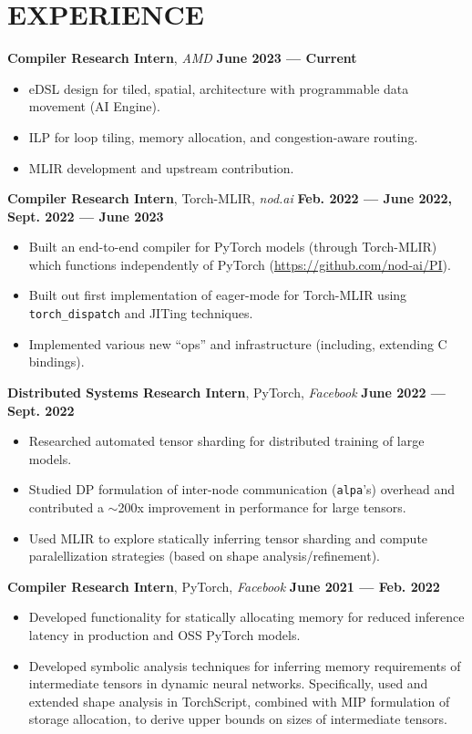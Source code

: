 \documentclass[11pt,letterpaper,roman,colorlinks,linkcolor=blue]{moderncv}
\newcommand*{\modern}{\fontfamily{qhv}\selectfont}
\newcommand{\mystyle}[1]{\textcolor{mygrey}{\modern #1}}
\newcommand{\mysectionstyle}[1]{\large\mystyle{#1}}
\begin{document}
\section{\mysectionstyle{EXPERIENCE}}

\textbf{Compiler Research Intern}, \emph{AMD}
\hfill \textbf{June 2023 --- Current}
\begin{itemize}
\item eDSL design for tiled, spatial, architecture with programmable data movement (AI Engine).
\item ILP for loop tiling, memory allocation, and congestion-aware routing.
\item MLIR development and upstream contribution.
\end{itemize}

\textbf{Compiler Research Intern}, Torch-MLIR, \emph{nod.ai}
\hfill \textbf{Feb. 2022 --- June 2022, Sept. 2022 --- June 2023}
\begin{itemize}
\item Built an end-to-end compiler for PyTorch models (through Torch-MLIR) which functions independently of PyTorch (\href{https://github.com/nod-ai/PI}{https://github.com/nod-ai/PI}).
\item Built out first implementation of eager-mode for Torch-MLIR using \texttt{torch\_dispatch} and JITing techniques.
\item Implemented various new ``ops'' and infrastructure (including, extending C bindings).
\end{itemize}

\textbf{Distributed Systems Research Intern}, PyTorch, \emph{Facebook}
\hfill \textbf{June 2022 --- Sept. 2022}
\begin{itemize}
\item Researched automated tensor sharding for distributed training of large models.
\item Studied DP formulation of inter-node communication (\texttt{alpa}'s) overhead and contributed a $\sim$200x improvement in performance for large tensors.
\item Used MLIR to explore statically inferring tensor sharding and compute paralellization strategies (based on shape analysis/refinement).
\end{itemize}

\textbf{Compiler Research Intern}, PyTorch, \emph{Facebook}
\hfill \textbf{June 2021 --- Feb. 2022}
\begin{itemize}
\item Developed functionality for statically allocating memory for reduced inference latency in production and OSS PyTorch models.
\item Developed symbolic analysis techniques for inferring memory requirements of intermediate tensors in dynamic neural networks. Specifically, used and extended shape analysis in TorchScript, combined with MIP formulation of storage allocation, to derive upper bounds on sizes of intermediate tensors.  
\end{itemize}
\end{document}
